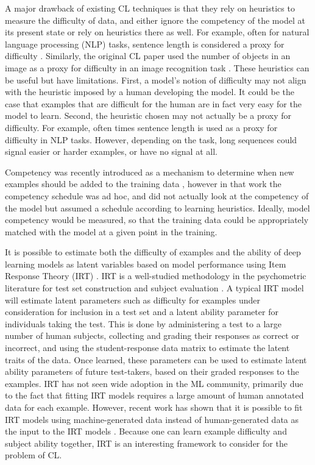 \documentclass[letterpaper]{article} %
\begin{document}
A major drawback of existing CL techniques is that they rely on heuristics to measure the difficulty of data, and either ignore the competency of the model at its present state or rely on heuristics there as well.
For example, often for natural language processing (NLP) tasks, sentence length is considered a proxy for difficulty \cite{bengio_curriculum_2009,platanios_competence-based_2019}.
Similarly, the original CL paper used the number of objects in an image as a proxy for difficulty in an image recognition task \cite{bengio_curriculum_2009}.
These heuristics can be useful but have limitations.
First, a model's notion of difficulty may not align with the heuristic imposed by a human developing the model.
It could be the case that examples that are difficult for the human are in fact very easy for the model to learn.
Second, the heuristic chosen may not actually be a proxy for difficulty.
For example, often times sentence length is used as a proxy for difficulty in NLP tasks.
However, depending on the task, long sequences could signal easier or harder examples, or have no signal at all.

Competency was recently introduced as a mechanism to determine when new examples should be added to the training data \cite{platanios_competence-based_2019}, however in that work the competency schedule was ad hoc, and did not actually look at the competency of the model but assumed a schedule according to learning heuristics. 
Ideally, model competency would be measured, so that the training data could be appropriately matched with the model at a given point in the training.

It is possible to estimate both the difficulty of examples and the ability of deep learning models as latent variables based on model performance using Item Response Theory (IRT) \cite{lalor_learning_2019}.
IRT is a well-studied methodology in the psychometric literature for test set construction and subject evaluation \cite{baker_item_2004}.
A typical IRT model will estimate latent parameters such as difficulty for examples under consideration for inclusion in a test set and a latent ability parameter for individuals taking the test.
This is done by administering a test to a large number of human subjects, collecting and grading their responses as correct or incorrect, and using the student-response data matrix to estimate the latent traits of the data.
Once learned, these parameters can be used to estimate latent ability parameters of future test-takers, based on their graded responses to the examples.
IRT has not seen wide adoption in the ML community, primarily due to the fact that fitting IRT models requires a large amount of human annotated data for each example.
However, recent work has shown that it is possible to fit IRT models using machine-generated data instead of human-generated data as the input to the IRT models \cite{lalor_learning_2019}.
Because one can learn example difficulty and subject ability together, IRT is an interesting framework to consider for the problem of CL. 
\end{document}
